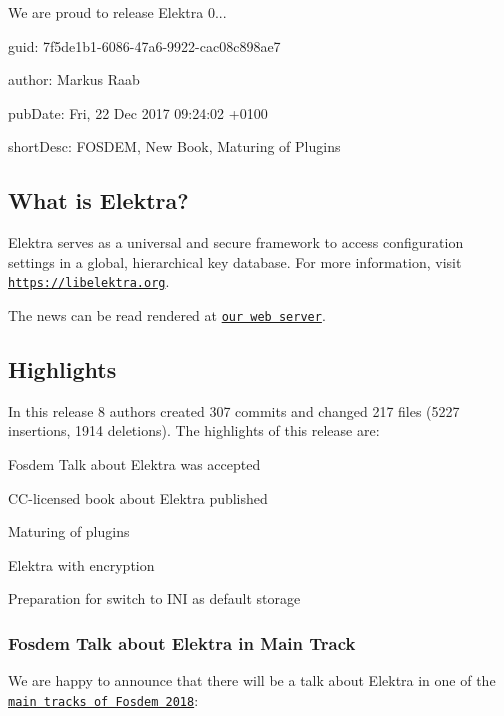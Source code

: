 We are proud to release Elektra 0...


\begin{DoxyItemize}
\item guid\+: 7f5de1b1-\/6086-\/47a6-\/9922-\/cac08c898ae7
\item author\+: Markus Raab
\item pub\+Date\+: Fri, 22 Dec 2017 09\+:24\+:02 +0100
\item short\+Desc\+: F\+O\+S\+D\+EM, New Book, Maturing of Plugins
\end{DoxyItemize}

\subsection*{What is Elektra?}

Elektra serves as a universal and secure framework to access configuration settings in a global, hierarchical key database. For more information, visit \href{https://libelektra.org}{\tt https\+://libelektra.\+org}.

The news can be read rendered at \href{https://www.libelektra.org/news/0.8.21-release}{\tt our web server}.

\subsection*{Highlights}

In this release 8 authors created 307 commits and changed 217 files (5227 insertions, 1914 deletions). The highlights of this release are\+:


\begin{DoxyItemize}
\item Fosdem Talk about Elektra was accepted
\item C\+C-\/licensed book about Elektra published
\item Maturing of plugins
\item Elektra with encryption
\item Preparation for switch to I\+NI as default storage
\end{DoxyItemize}

\subsubsection*{Fosdem Talk about Elektra in Main Track}

We are happy to announce that there will be a talk about Elektra in one of the \href{https://fosdem.org/2018/schedule/event/elektra/}{\tt main tracks of Fosdem 2018}\+:


